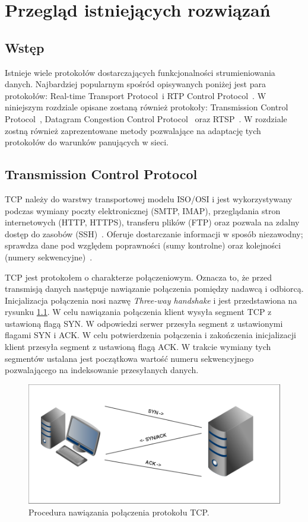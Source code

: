 \chapter{Przegląd istniejących rozwiązań}
\label{cha:rozdzial3}

\section{Wstęp}

Istnieje wiele protokołów dostarczających funkcjonalności strumieniowania danych. Najbardziej popularnym spośród opisywanych poniżej jest para protokołów: Real-time Transport Protocol~i RTP Control Protocol~\cite{RFC3550}. W niniejszym rozdziale opisane zostaną również protokoły: Transmission Control Protocol~\cite{RFC793}, Datagram Congestion Control Protocol~\cite{RFC4340} oraz RTSP~\cite{RFC2326}. W rozdziale zostną również zaprezentowane metody pozwalające na adaptację tych protokołów do warunków panujących w sieci.

\section{Transmission Control Protocol}

TCP należy do warstwy transportowej modelu ISO/OSI i jest wykorzystywany podczas wymiany poczty elektronicznej (SMTP, IMAP), przeglądania stron internetowych (HTTP, HTTPS), transferu plików (FTP) oraz pozwala na zdalny dostęp do zasobów (SSH)~\cite{Stevens}. Oferuje dostarczanie informacji w sposób niezawodny; sprawdza dane pod względem poprawności (sumy kontrolne) oraz kolejności (numery sekwencyjne)~\cite{RFC793}.

TCP jest protokołem o charakterze połączeniowym. Oznacza to, że przed transmisją danych następuje nawiązanie połączenia pomiędzy nadawcą i odbiorcą. Inicjalizacja połączenia nosi nazwę \textit{Three-way handshake} i jest przedstawiona na rysunku \ref{handshake}. W celu nawiązania połączenia klient wysyła segment TCP z ustawioną flagą SYN. W odpowiedzi serwer przesyła segment z ustawionymi flagami SYN i ACK. W celu potwierdzenia połączenia i zakończenia inicjalizacji klient przesyła segment z ustawioną flagą ACK. W trakcie wymiany tych segmentów ustalana jest początkowa wartość numeru sekwencyjnego pozwalającego na indeksowanie przesyłanych danych.

\begin{figure}[h!]
	\centering
		\includegraphics[width=0.9\linewidth]{handshake}
	\caption{Procedura nawiązania połączenia protokołu TCP.}
	\label{handshake}
\end{figure}

